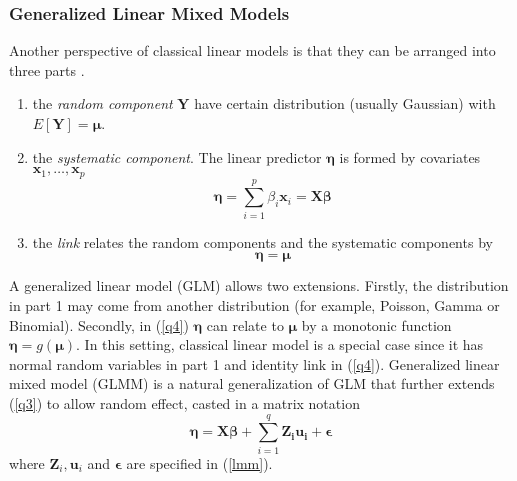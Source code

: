 	\subsubsection{Generalized Linear Mixed Models}
	Another perspective of classical linear models is that they can be arranged into three parts \citep[Chapter 2]{mccullagh1989generalized} .
	\begin{enumerate}
		\item the \textit{random component} $\bm Y$ have certain distribution (usually Gaussian) with $E[\bm Y]= \bm \mu$.
		\item the \textit{systematic component}. The linear predictor $\bm \eta$ is formed by covariates $\bm x_1,\ldots, \bm x_p$ 
		\begin{equation}\label{q3}
			\bm \eta = \sum_{i=1}^p\beta_i\bm x_i=\bm {X\beta}
		\end{equation}
		\item the \textit{link} relates the random components and the systematic components by 
		\begin{equation}\label{q4}
			\bm \eta = \bm \mu
		\end{equation}
	\end{enumerate}
	A generalized linear model (GLM) allows two extensions. Firstly, the distribution in part 1 may come from another distribution (for example, Poisson, Gamma or Binomial). Secondly, in (\ref{q4}) $\bm \eta $ can relate to  $\bm\mu$ by a monotonic function $\bm \eta = g(\bm \mu)$. In this setting, classical linear model is a special case since it has normal random variables in part 1 and identity link in (\ref{q4}). 
	Generalized linear mixed model (GLMM) is a natural generalization of GLM  that further extends (\ref{q3}) to allow random effect, casted in a matrix notation
		\begin{equation}\label{q5}
			\bm \eta = \bm {X\beta} + \sum_{i=1}^q\bm {Z_iu_i} + \bm \epsilon
		\end{equation}
	where  $\bm Z_i, \bm u_i$ and $\bm \epsilon$ are specified in  (\ref{lmm}). \\
